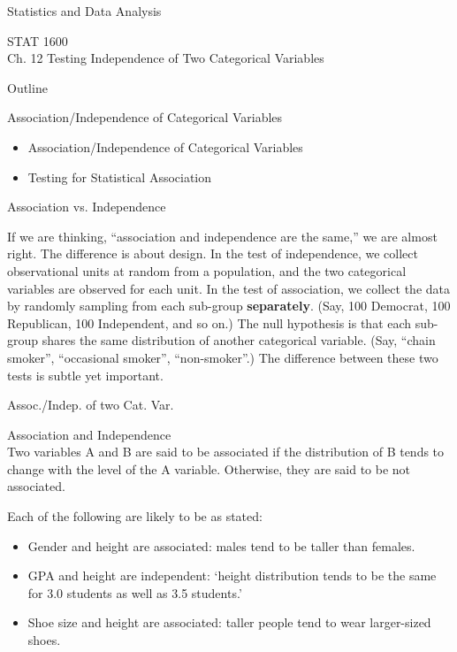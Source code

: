 \documentclass[14pt]{beamer}\usepackage[]{graphicx}\usepackage[]{color}
\begin{document}
\begin{frame}[fragile]{Statistics and Data Analysis}

STAT 1600 \\ Ch. 12 Testing Independence of Two Categorical  Variables

\end{frame}

\begin{frame}[fragile]{Outline}

Association/Independence of Categorical Variables  

\begin{itemize}
\item Association/Independence of Categorical Variables  
\item Testing for Statistical Association
\end{itemize}

\end{frame}

\begin{frame}[fragile]{Association vs. Independence}

{\small{
If we are thinking, ``association and independence are the same,'' we are almost right. The difference is about design. In the test of independence, we collect observational units at random from a population, and the two categorical variables are observed for each unit. In the test of association, we collect the data by randomly sampling from each sub-group \textbf{separately}. (Say, 100 Democrat, 100 Republican, 100 Independent, and so on.) The null hypothesis is that each sub-group shares the same distribution of another categorical variable. (Say, ``chain smoker'', ``occasional smoker'', ``non-smoker''.)  The difference between these two tests is subtle yet important.
}}
\end{frame}

\begin{frame}[fragile]{Assoc./Indep. of two Cat. Var.}

{\small{
Association and Independence \\
Two variables A and B are said to be associated if the distribution of B  tends to change with the level of the A variable. Otherwise, they are  said to be not associated.

Each of the following are likely to be as stated:

\begin{itemize}
\item<1-> Gender and height are associated: males tend to be taller than  females.
\item<2-> GPA and height are independent: `height distribution tends to be the same for 3.0 students as well as 3.5 students.'
\item<3-> Shoe size and height are associated: taller people tend to wear larger-sized shoes.
\end{itemize}
}}
\end{frame}
\end{document}

